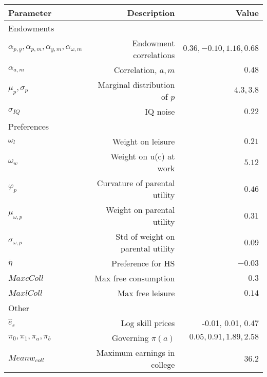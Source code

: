 \begin{tabular}{lrr}
\hline
Parameter & Description  & Value  \\
\hline
Endowments &   &   \\
$\alpha_{p,y}, \alpha_{p,m}, \alpha_{y,m}, \alpha_{\omega,m}$ & Endowment correlations  & $0.36, -0.10, 1.16, 0.68$  \\
$\alpha_{a,m}$ & Correlation, $a,m$  & $0.48$  \\
$\mu_{p}, \sigma_{p}$ & Marginal distribution of $p$  & $4.3, 3.8$  \\
$\sigma_{IQ}$ & IQ noise  & $0.22$  \\
Preferences &   &   \\
$\omega_{l}$ & Weight on leisure  & $0.21$  \\
$\omega_{w}$ & Weight on u(c) at work  & $5.12$  \\
$\varphi_{p}$ & Curvature of parental utility  & $0.46$  \\
$\mu_{\omega,p}$ & Weight on parental utility  & $0.31$  \\
$\sigma_{\omega,p}$ & Std of weight on parental utility  & $0.09$  \\
$\bar{\eta}$ & Preference for HS  & $-0.03$  \\
$Max cColl$ & Max free consumption  & $0.3$  \\
$Max lColl$ & Max free leisure  & $0.14$  \\
Other &   &   \\
$\hat{e}_{s}$ & Log skill prices  & -0.01, 0.01, 0.47  \\
$\pi_{0}, \pi_{1}, \pi_{a}, \pi_{b}$ & Governing $\pi(a)$  & $0.05, 0.91, 1.89, 2.58$  \\
$Mean w_{coll}$ & Maximum earnings in college  & $36.2$  \\
\hline
\end{tabular}%
